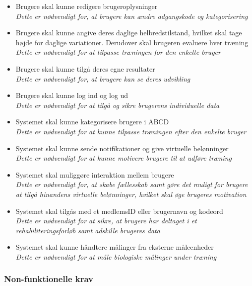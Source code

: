 \noindent	
\begin{itemize}
\item Brugere skal kunne redigere brugeroplysninger
	\\
	\textit{Dette er nødvendigt for, at brugere kan ændre adgangskode og kategorisering}
\item Brugere skal kunne angive deres daglige helbredstilstand, hvilket skal tage højde for daglige variationer. Derudover skal brugeren evaluere hver træning
\\
\textit{Dette er nødvendigt for at tilpasse træningen for den enkelte bruger}
\item Brugere skal kunne tilgå deres egne resultater
	\\
	\textit{Dette er nødvendigt for, at brugere kan se deres udvikling}
\item Brugere skal kunne log ind og log ud
	\\
	\textit{Dette er nødvendigt for at tilgå og sikre brugerens individuelle data}
\item Systemet skal kunne kategorisere brugere i ABCD
\\
	\textit{Dette er nødvendigt for at kunne tilpasse træningen efter den enkelte bruger}
\item Systemet skal kunne sende notifikationer og give virtuelle belønninger 
	\\
	\textit{Dette er nødvendigt for at kunne motivere brugere til at udføre træning}
\item Systemet skal muliggøre interaktion mellem brugere
	\\
	\textit{Dette er nødvendigt for, at skabe fællesskab samt gøre det muligt for brugere at tilgå hinandens virtuelle belønninger, hvilket skal øge brugeres motivation}

	\item Systemet skal tilgås med et medlemsID eller brugernavn og kodeord
	\\
\textit{Dette er nødvendigt for at sikre, at brugere har deltaget i et rehabiliteringsforløb samt adskille brugeres data}
\item Systemet skal kunne håndtere målinger fra eksterne måleenheder
\\
\textit{Dette er nødvendigt for at måle biologiske målinger under træning}
\end{itemize}


\subsubsection{Non-funktionelle krav}

